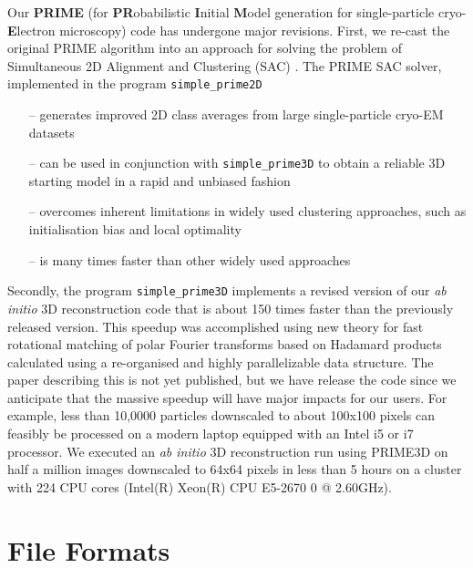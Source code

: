 \documentclass[a4paper,11pt]{article}
\newcommand{\prgname}[1]{\textcolor{NavyBlue}{\texttt{#1}}}
\begin{document}
Our \textbf{PRIME} (for \textbf{PR}obabilistic \textbf{I}nitial \textbf{M}odel generation for single-particle cryo-\textbf{E}lectron microscopy) code has undergone major revisions. First, we re-cast the original PRIME algorithm into an approach for solving  the problem of Simultaneous 2D Alignment and Clustering (SAC) \citep{reboul2016stochastic}. The PRIME SAC solver, implemented in the program \prgname{simple\_prime2D}
\begin{itemize}
    \item[--] generates improved 2D class averages from large single-particle cryo-EM datasets
    \item[--] can be used in conjunction with \prgname{simple\_prime3D} to obtain a reliable 3D starting model in a rapid and unbiased fashion
    \item[--] overcomes inherent limitations in widely used clustering approaches, such as initialisation bias and local optimality
    \item[--] is many times faster than other widely used approaches
\end{itemize}
Secondly, the program \prgname{simple\_prime3D} implements a revised version of our \textit{ab initio} 3D reconstruction code that is about 150 times faster than the previously released version. This speedup was accomplished using new theory for fast rotational matching of polar Fourier transforms based on Hadamard products calculated using a re-organised and highly parallelizable data structure. The paper describing this is not yet published, but we have release the code since we anticipate that the massive speedup will have major impacts for our users. For example, less than 10,0000 particles downscaled to about 100x100 pixels can feasibly be processed on a modern laptop equipped with an Intel i5 or i7 processor. We executed an \textit{ab initio} 3D reconstruction run using PRIME3D on half a million images downscaled to 64x64 pixels in less than 5 hours on a cluster with 224 CPU cores (Intel(R) Xeon(R) CPU E5-2670 0 @ 2.60GHz).

\section{File Formats}
\end{document}
